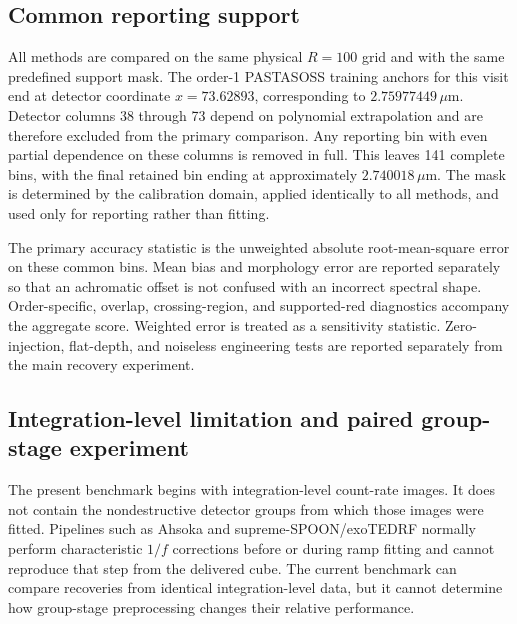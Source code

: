 \subsection{Common reporting support}

All methods are compared on the same physical $R=100$ grid and with the same
predefined support mask. The order-1 PASTASOSS training anchors for this visit
end at detector coordinate $x=73.62893$, corresponding to
$2.75977449\,\mu\mathrm{m}$. Detector columns 38 through 73 depend on
polynomial extrapolation and are therefore excluded from the primary
comparison. Any reporting bin with even partial dependence on these columns is
removed in full. This leaves 141 complete bins, with the final retained bin
ending at approximately $2.740018\,\mu\mathrm{m}$. The mask is determined by
the calibration domain, applied identically to all methods, and used only for
reporting rather than fitting.

The primary accuracy statistic is the unweighted absolute root-mean-square
error on these common bins. Mean bias and morphology error are reported
separately so that an achromatic offset is not confused with an incorrect
spectral shape. Order-specific, overlap, crossing-region, and supported-red
diagnostics accompany the aggregate score. Weighted error is treated as a
sensitivity statistic. Zero-injection, flat-depth, and noiseless engineering
tests are reported separately from the main recovery experiment.

\subsection{Integration-level limitation and paired group-stage experiment}

The present benchmark begins with integration-level count-rate images. It does
not contain the nondestructive detector groups from which those images were
fitted. Pipelines such as Ahsoka and supreme-SPOON/exoTEDRF normally perform
characteristic $1/f$ corrections before or during ramp fitting and cannot
reproduce that step from the delivered cube. The current benchmark can compare
recoveries from identical integration-level data, but it cannot determine how
group-stage preprocessing changes their relative performance.

